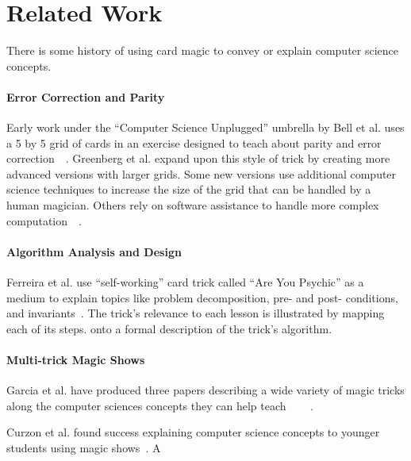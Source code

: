 \section{Related Work}
\label{SEC:related-work}

There is some history of using card magic to convey or explain computer science
concepts.

\paragraph{Error Correction and Parity}
Early work under the ``Computer Science Unplugged'' umbrella by Bell et al. uses
a 5 by 5 grid of cards in an exercise designed to teach about parity and
error correction~\cite{bell2009computer}~\cite{csunplugged}.
Greenberg et al. expand upon this style of trick by creating more advanced
versions with larger grids.  Some new versions use additional computer science
techniques to increase the size of the grid that can be handled by a human
magician.  Others rely on software assistance to handle more complex
computation~\cite{Greenberg2017}~\cite{Greenberg2018}.

\paragraph{Algorithm Analysis and Design}
Ferreira et al. use ``self-working'' card trick called ``Are You Psychic''
as a medium to explain topics
like problem decomposition, pre- and post- conditions, and
invariants~\cite{ferreira2014magic}.
The trick's relevance to each lesson is illustrated by
mapping each of its steps.
onto a formal description of the trick's algorithm.

\paragraph{Multi-trick Magic Shows}
Garcia et al. have produced three papers describing a wide variety of magic
tricks along the computer sciences concepts they can help
teach~\cite{garcia2012demystifying}
~\cite{garcia2013demystifying}
~\cite{garcia2016demystifying}.

Curzon et al. found success explaining computer
science concepts to younger students using magic shows~\cite{Curzon2008}.
A 
